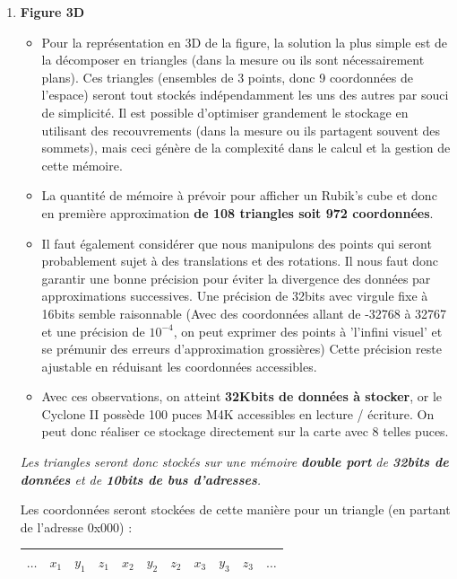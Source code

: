 \documentclass[10pt,a4paper]{report}
\begin{document}
\begin{enumerate}
\item \textbf{Figure 3D}
\begin{itemize}
\item Pour la représentation en 3D de la figure, la solution la plus simple est de la décomposer en triangles (dans la mesure ou ils sont nécessairement plans). Ces triangles (ensembles de 3 points, donc 9 coordonnées de l'espace) seront tout stockés indépendamment les uns des autres par souci de simplicité. Il est possible d'optimiser grandement le stockage en utilisant des recouvrements (dans la mesure ou ils partagent souvent des sommets), mais ceci génère de la complexité dans le calcul et la gestion de cette mémoire.

\item La quantité de mémoire à prévoir pour afficher un Rubik's cube et donc en première approximation \textbf{de 108 triangles soit 972 coordonnées}. 

\item Il faut également considérer que nous manipulons des points qui seront probablement sujet à des translations et des rotations. Il nous faut donc garantir une bonne précision pour éviter la divergence des données par approximations successives. Une précision de 32bits avec virgule fixe à 16bits semble raisonnable (Avec des coordonnées allant de -32768 à 32767 et une précision de $10^{-4}$, on peut exprimer des points à 'l'infini visuel' et se prémunir des erreurs d'approximation grossières) Cette précision reste ajustable en réduisant les coordonnées accessibles. 

\item Avec ces observations, on atteint \textbf{32Kbits de données à stocker}, or le Cyclone II possède 100 puces M4K accessibles en lecture / écriture. On peut donc réaliser ce stockage directement sur la carte avec 8 telles puces.

\end{itemize}
\emph{Les triangles seront donc stockés sur une mémoire \textbf{double port} de \textbf{32bits de données} et de \textbf{10bits de bus d'adresses}.}

Les coordonnées seront stockées de cette manière pour un triangle (en partant de l'adresse 0x000) :
\begin{center}
\begin{tabular}{|c|c|c|c|c|c|c|c|c|c|c|}
\hline 
$\ldots$ & $x_1$ & $y_1$ & $z_1$ & $x_2$ & $y_2$ & $z_2$ & $x_3$ & $y_3$ & $z_3$ & $\ldots$ \\ 
\hline 
\end{tabular} 
\end{center}


\end{enumerate}
\end{document}
